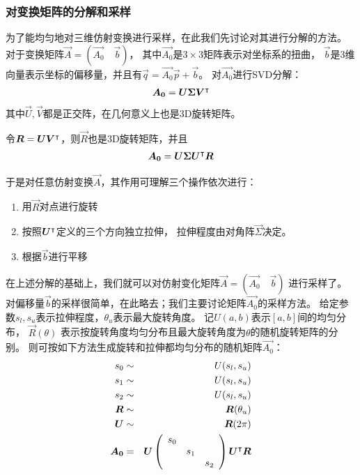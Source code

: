 \subsubsection{对变换矩阵的分解和采样}
为了能均匀地对三维仿射变换进行采样，在此我们先讨论对其进行分解的方法。
对于变换矩阵$\vec{A} = (\vec{A_0}\quad\vec{b})$，
其中$\vec{A_0}$是$3\times 3$矩阵表示对坐标系的扭曲，
$\vec{b}$是3维向量表示坐标的偏移量，并且有$\vec{q}=\vec{A_0}\vec{p}+\vec{b}$。
对$\vec{A_0}$进行SVD分解：
\begin{eqnarray}
    \boldsymbol{A_0} = \boldsymbol{U}\boldsymbol{\Sigma}\boldsymbol{V}^\intercal
\end{eqnarray}
其中$\vec{U}, \vec{V}$都是正交阵，在几何意义上也是3D旋转矩阵。

令$\boldsymbol{R} = \boldsymbol{U}\boldsymbol{V}^\intercal$，则$\vec{R}$也是3D旋转矩阵，并且
\begin{eqnarray}
    \boldsymbol{A_0} = \boldsymbol{U}\boldsymbol{\Sigma}\boldsymbol{U}^\intercal\boldsymbol{R}
    \label{eqn:cnn:affine:a0}
\end{eqnarray}

于是对任意仿射变换$\vec{A}$，其作用可理解三个操作依次进行：
\begin{enumerate}
    \item 用$\vec{R}$对点进行旋转
    \item 按照$\boldsymbol{U}^\intercal$定义的三个方向独立拉伸，
        拉伸程度由对角阵$\vec{\Sigma}$决定。
    \item 根据$\vec{b}$进行平移
\end{enumerate}

在上述分解的基础上，我们就可以对仿射变化矩阵$\vec{A} = (\vec{A_0}\quad\vec{b})$
进行采样了。
对偏移量$\vec{b}$的采样很简单，在此略去；我们主要讨论矩阵$\vec{A_0}$的采样方法。
给定参数$s_l, s_u$表示拉伸程度，$\theta_u$表示最大旋转角度。
记$U(a, b)$表示$[a, b]$间的均匀分布，
$\vec{R}(\theta)$
表示按旋转角度均匀分布且最大旋转角度为$\theta$的随机旋转矩阵的分别。
则可按如下方法生成旋转和拉伸都均匀分布的随机矩阵$\vec{A_0}$：
\begin{eqnarray}
    s_0 &\sim& U(s_l, s_u) \nonumber \\
    s_1 &\sim& U(s_l, s_u) \nonumber \\
    s_2 &\sim& U(s_l, s_u) \nonumber \\
    \boldsymbol{R} &\sim& \boldsymbol{R}(\theta_u) \nonumber \\
    \boldsymbol{U} &\sim& \boldsymbol{R}(2\pi) \nonumber \\
    \boldsymbol{A_0} &=&  \boldsymbol{U}\left(\begin{array}{ccc}
        s_0 & & \\
        & s_1 & \\
        & & s_2
    \end{array}\right)\boldsymbol{U}^\intercal\boldsymbol{R}
\end{eqnarray}

